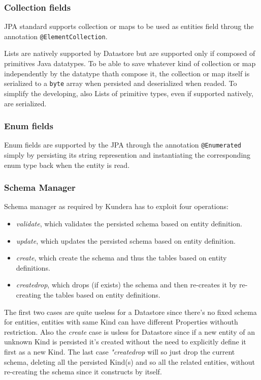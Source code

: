\subsubsection{Collection fields}
JPA standard supports collection or maps to be used as entities field throug the annotation \texttt{@ElementCollection}.

\newparagraph Lists are natively supported by Datastore but are supported only if composed of primitives Java datatypes.
\noindent To be able to save whatever kind of collection or map independently by the datatype thath compose it, the collection or map itself is serialized to a \texttt{byte} array when persisted and deserialized when readed.
\noindent To simplify the developing, also Lists of primitive types, even if supported natively, are serialized.

\subsubsection{Enum fields}
Enum fields are supported by the JPA through the annotation \texttt{@Enumerated}  simply by persisting its string represention and instantiating the corresponding enum type back when the entity is read.

\subsubsection{Schema Manager}
Schema manager as required by Kundera has to exploit four operations:
\begin{itemize}
\item \textit{validate}, which validates the persisted schema based on entity definition.
\item \textit{update}, which updates the persisted schema based on entity definition.
\item \textit{create}, which create the schema and thus the tables based on entity definitions.
\item \textit{create\textunderscore drop}, which drops (if exists) the schema and then re-creates it by re-creating the tables based on entity definitions.
\end{itemize}

\noindent The first two cases are quite useless for a Datastore since there's no fixed schema for entities, entities with same Kind can have different Properties withouth restriction.
Also the \textit{create} case is usless for Datastore since if a new entity of an unknown Kind is persisted it's created without the need to explicitly define it first as a new Kind.
The last case \textit{"create\textunderscore drop} will so just drop the current schema, deleting all the persisted Kind(s) and so all the related entities, without re-creating the schema since it constructs by itself.

